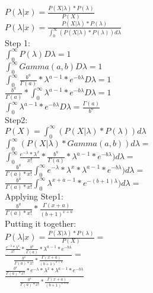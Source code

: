 $ P(\lambda | x) = \frac{P(X|\lambda) * P(\lambda)}{P(X)}$ \\
$ P(\lambda | x) = \frac{P(X|\lambda) * P(\lambda)}{\int_{0}^{\infty}(P(X|\lambda) * P(\lambda))d{\lambda}}$ \\

Step 1: \\

$\int_{0}^{\infty} P(\lambda) D{\lambda} = 1$\\
$\int_{0}^{\infty} Gamma(a,b) D{\lambda} = 1$\\
$\int_{0}^{\infty} \frac{b^a}{\Gamma(a)} * \lambda^{a-1} * e^{-b\lambda} D{\lambda} = 1$\\ 
$\frac{b^a}{\Gamma(a)} * \int_{0}^{\infty} \lambda^{a-1} * e^{-b\lambda} D{\lambda} = 1$\\
$\int_{0}^{\infty} \lambda^{a-1} * e^{-b\lambda} D{\lambda} = \frac{\Gamma(a)}{b^a}$\\

Step2: \\

$P(X) = \int_{0}^{\infty}(P(X|\lambda) * P(\lambda))d{\lambda} $ \\
$\int_{0}^{\infty}(P(X|\lambda) * Gamma(a,b) )d{\lambda} =$ \\
$\int_{0}^{\infty}\frac{e^{-\lambda} * \lambda^x}{x!} * \frac{b^a}{\Gamma(a)} * \lambda^{a-1} * e^{-b\lambda} )d{\lambda} =$ \\
$\frac{b^a}{\Gamma(a)*x!} \int_{0}^{\infty}e^{-\lambda} * \lambda^x * \lambda^{a-1} * e^{-b\lambda} )d{\lambda} =$\\

$\frac{b^a}{\Gamma(a)*x!} \int_{0}^{\infty} \lambda^{x+a-1} * e^{-(b+1)\lambda} )d{\lambda} =$\\
Applying Step1:\\
$\frac{b^a}{\Gamma(a)*x!} * \frac{\Gamma(x+a)}{(b+1)^{x+a}}$\\
Putting it together:\\
$ P(\lambda | x) = \frac{P(X|\lambda) * P(\lambda)}{P(X)}=$ \\
$\frac{\frac{e^{-\lambda} * \lambda^x}{x!} * \frac{b^a}{\Gamma(a)} * \lambda^{a-1} * e^{-b\lambda} }{\frac{b^a}{\Gamma(a)*x!} * \frac{\Gamma(x+a)}{(b+1)^{x+a}}} =$ \\

$\frac{\frac{b^a}{\Gamma(a)*x!} * {e^{-\lambda} * \lambda^x} * \lambda^{a-1} * e^{-b\lambda} }{\frac{b^a}{\Gamma(a)*x!} * \frac{\Gamma(x+a)}{(b+1)^{x+a}}} $ \\

